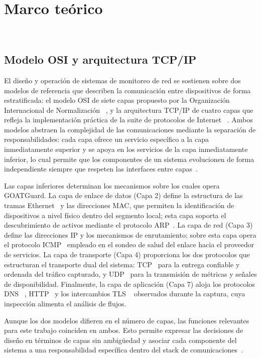 \section{Marco teórico}
~\label{sec:marco-teorico}

\subsection{Modelo OSI y arquitectura TCP/IP}

El diseño y operación de sistemas de monitoreo de red se sostienen 
sobre dos modelos de referencia que describen la comunicación entre 
dispositivos de forma estratificada: el modelo OSI de siete capas 
propuesto por la Organización Internacional de Normalización 
~\cite{iso7498}, y la arquitectura TCP/IP de cuatro capas que refleja 
la implementación práctica de la suite de protocolos de Internet 
~\cite{forouzan2006transmision}. Ambos modelos abstraen la complejidad 
de las comunicaciones mediante la separación de responsabilidades: 
cada capa ofrece un servicio específico a la capa inmediatamente 
superior y se apoya en los servicios de la capa inmediatamente 
inferior, lo cual permite que los componentes de un sistema 
evolucionen de forma independiente siempre que respeten las 
interfaces entre capas~\cite{kurose2010redes}.

Las capas inferiores determinan los mecanismos sobre los cuales opera 
GOATGuard. La capa de enlace de datos (Capa 2) define la estructura 
de las tramas Ethernet~\cite{ieee8023} y las direcciones MAC, que 
permiten la identificación de dispositivos a nivel físico dentro del 
segmento local; esta capa soporta el descubrimiento de activos 
mediante el protocolo ARP~\cite{rfc826}. La capa de red (Capa 3) 
define las direcciones IP y los mecanismos de enrutamiento; sobre 
esta capa opera el protocolo ICMP~\cite{rfc792} empleado en el 
sondeo de salud del enlace hacia el proveedor de servicios. La capa 
de transporte (Capa 4) proporciona los dos protocolos que estructuran 
el transporte dual del sistema: TCP~\cite{rfc793} para la entrega 
confiable y ordenada del tráfico capturado, y UDP~\cite{rfc768} para 
la transmisión de métricas y señales de disponibilidad. Finalmente, 
la capa de aplicación (Capa 7) aloja los protocolos DNS 
~\cite{rfc1035}, HTTP~\cite{rfc9110} y los intercambios TLS 
~\cite{rfc8446} observados durante la captura, cuya inspección 
alimenta el análisis de flujos.

Aunque los dos modelos difieren en el número de capas, las funciones 
relevantes para este trabajo coinciden en ambos. Esto permite 
expresar las decisiones de diseño en términos de capas sin ambigüedad 
y asociar cada componente del sistema a una responsabilidad 
específica dentro del stack de comunicaciones~\cite{kurose2010redes}.

